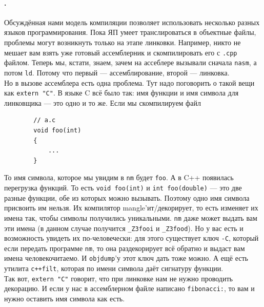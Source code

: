 \documentclass{article}
\newcommand{\asm}[1]{\texttt{#1}}
\begin{document}
    \paragraph{.}
    Обсуждённая нами модель компиляции позволяет использовать несколько разных языков программирования. Пока ЯП умеет транслироваться в объектные файлы, проблемы могут возникнуть только на этапе линковки. Например, никто не мешает вам взять уже готовый ассемблерник и скомпилировать его с \texttt{.cpp} файлом. Теперь мы, кстати, знаем, зачем на ассеблере вызывали сначала \texttt{nasm}, а потом \texttt{ld}. Потому что первый --- ассемблирование, второй --- линковка.\\
    Но в вызове ассемблера есть одна проблема. Тут надо поговорить о такой вещи как \texttt{extern "C"}. В языке C всё было так: имя функции и имя символа для линковщика --- это одно и то же. Если мы скомпилируем файл
    \begin{verbatim}
        // a.c
        void foo(int)
        {
            ...
        }
    \end{verbatim}
    То имя символа, которое мы увидим в \texttt{nm} будет \texttt{foo}. А в C++ появилась перегрузка функций. То есть \texttt{void foo(int)} и \texttt{int foo(double)} --- это две разные функции, обе из которых можно вызывать. Поэтому одно имя символа присвоить им нельзя. Их компилятор mangle'ит/декорирует, то есть изменяет их имена так, чтобы символы получились уникальными. \texttt{nm} даже может выдать вам эти имена (в данном случае получится \texttt{_Z3fooi} и \texttt{_Z3food}). Но у вас есть и возможность увидеть их по-человечески: для этого существует ключ \texttt{-C}, который если передать программе \texttt{nm}, то она раздекорирует всё обратно и выдаст вам имена человекочитаемо. И \texttt{objdump}'у этот ключ дать тоже можно. А ещё есть утилита \texttt{c++filt}, которая по имени символа даёт сигнатуру функции.\\
    Так вот, \texttt{extern "C"} говорит, что при линковке нам не нужно проводить декорацию. И если у нас в ассемблерном файле написано \asm{fibonacci:}, то вам и нужно оставить имя символа как есть.
\end{document}
